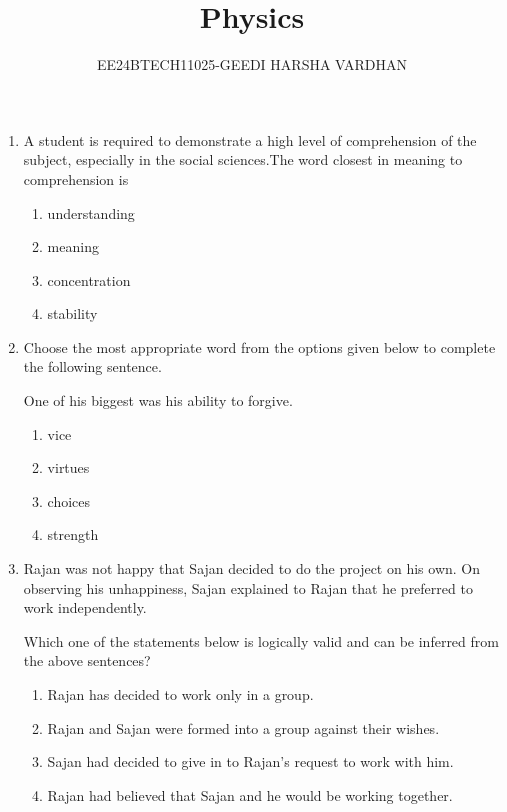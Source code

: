 \documentclass[journal,12pt,onecolumn]{IEEEtran}
\theoremstyle{remark}
\begin{document}

\vspace{3cm}

\title{Physics}
\author{EE24BTECH11025-GEEDI HARSHA VARDHAN}
\maketitle
\bigskip

\renewcommand{\thefigure}{\theenumi}
\renewcommand{\thetable}{\theenumi}

\begin{enumerate}
\item
A student is required to demonstrate a high level of comprehension of the subject, especially in the social sciences.The word closest in meaning to comprehension is

\begin{enumerate}
\item  understanding
\item  meaning
\item  concentration
\item  stability
\end{enumerate}

\item 
Choose the most appropriate word from the options given below to complete the following sentence.

One of his biggest was his ability to forgive.

\begin{enumerate}
\item  vice
\item  virtues
\item  choices
\item  strength
\end{enumerate}

\item 
Rajan was not happy that Sajan decided to do the project on his own. On observing his unhappiness, Sajan explained to Rajan that he preferred to work independently.

Which one of the statements below is logically valid and can be inferred from the above sentences?

\begin{enumerate}
\item  Rajan has decided to work only in a group.
\item  Rajan and Sajan were formed into a group against their wishes.
\item  Sajan had decided to give in to Rajan's request to work with him.
\item  Rajan had believed that Sajan and he would be working together.
\end{enumerate}


\end{enumerate}
\end{document}
